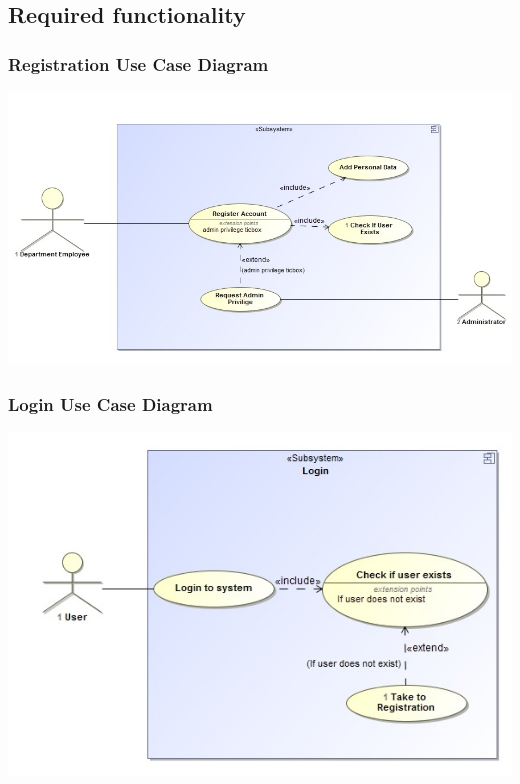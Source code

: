 \documentclass[a4paper,12pt]{article}
\begin{document}
\subsection{Required functionality}
	\subsubsection{Registration Use Case Diagram}
	\includegraphics[width=1\textwidth]{./Registration.jpg}\\[1.5cm]
	 
	\subsubsection{Login Use Case Diagram}
	\includegraphics[width=1\textwidth]{./Login.jpg}\\[1.5cm] 
	
\end{document}
